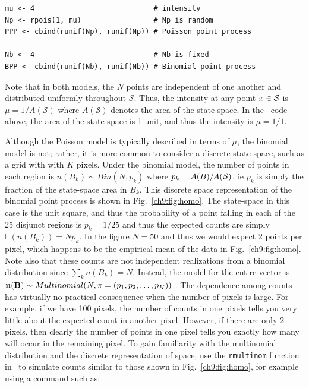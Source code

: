 \begin{verbatim}
mu <- 4                            # intensity
Np <- rpois(1, mu)                 # Np is random
PPP <- cbind(runif(Np), runif(Np)) # Poisson point process

Nb <- 4                            # Nb is fixed
BPP <- cbind(runif(Nb), runif(Nb)) # Binomial point process
\end{verbatim}

Note that in both models, the $N$ points are independent
of one another and distributed uniformly
throughout $\mathcal{S}$. Thus, the intensity at any point $x \in
\cal{S}$ is $\mu = 1 / A(\mathcal{S})$ where $A(\mathcal{S})$ denotes
the area of the state-space. In the \R~code above, the area of the
state-space is 1 unit, and thus the intensity is $\mu = 1/1$.

Although the Poisson model is typically described in terms of $\mu$,
the binomial model is not; rather, it
is more common to consider a discrete state space, such as a grid with
with $K$ pixels. Under the binomial model, the number of points in
each region is $n(B_k) \sim Bin(N, p_k)$
where $p_k = A(B)/A(\cal{S})$, ie $p_k$ is simply the fraction of
the state-space area in $B_k$. This discrete space representation of
the binomial point process is shown in Fig.~\ref{ch9:fig:homo}. The
state-space in this case is the unit square, and thus the probability of a
point falling in each of the 25 disjunct regions is $p_k = 1/25$ and
thus the expected counts are simply $\mathbb{E}(n(B_k)) = Np_k$. In
the figure $N=50$ and thus we would expect 2 points per pixel, which
happens to be the empirical mean of the data in
Fig.~\ref{ch9:fig:homo}. Note also that these counts are not
independent realizations from a binomial distribution since $\sum_k
n(B_k) = N$. Instead, the model for the entire vector
is ${\bf n(B)} \sim Multinomial(N, {\mathbf{\pi}} = (p_1, p_2, \dots,
p_K))$ \citep{illian:2008}. The dependence among counts has virtually
no practical consequence when the number of pixels is large. For
example, if we have 100 pixels, the number of counts in one pixels
tells you very little about the expected count in another
pixel. However, if there are only 2 pixels, then clearly the number of
points in one pixel tells you exactly how many will occur in the
remaining pixel. To gain familiarity with the multinomial distribution
and the discrete representation of space, use the \verb+rmultinom+
function in \R~to simulate counts similar to those shown in
Fig.~\ref{ch9:fig:homo}, for example using a command
such as:

